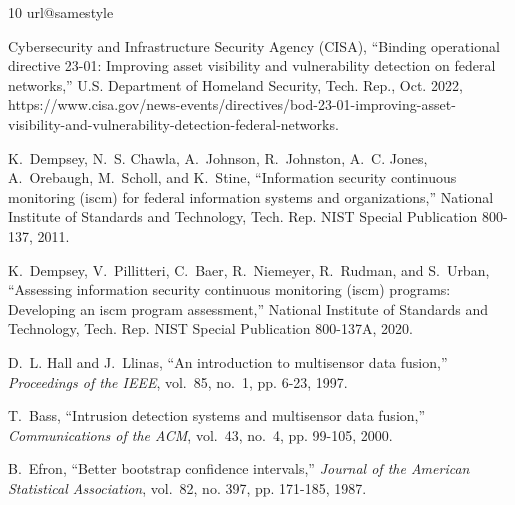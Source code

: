 \documentclass[journal]{IEEEtran}
\begin{document}
\begin{thebibliography}{10}
\providecommand{\url}[1]{#1}
\csname url@samestyle\endcsname
\providecommand{\newblock}{\relax}
\providecommand{\bibinfo}[2]{#2}
\providecommand{\BIBentrySTDinterwordspacing}{\spaceskip=0pt\relax}
\providecommand{\BIBentryALTinterwordstretchfactor}{4}
\providecommand{\BIBentryALTinterwordspacing}{\spaceskip=\fontdimen2\font plus
\BIBentryALTinterwordstretchfactor\fontdimen3\font minus
  \fontdimen4\font\relax}
\providecommand{\BIBforeignlanguage}[2]{{%
\expandafter\ifx\csname l@#1\endcsname\relax
\typeout{** WARNING: IEEEtran.bst: No hyphenation pattern has been}%
\typeout{** loaded for the language `#1'. Using the pattern for}%
\typeout{** the default language instead.}%
\else
\language=\csname l@#1\endcsname
\fi
#2}}
\providecommand{\BIBdecl}{\relax}
\BIBdecl

{Cybersecurity and Infrastructure Security Agency (CISA)}, ``Binding
  operational directive 23-01: Improving asset visibility and vulnerability
  detection on federal networks,'' U.S. Department of Homeland Security, Tech.
  Rep., Oct. 2022,
  \url{https://www.cisa.gov/news-events/directives/bod-23-01-improving-asset-visibility-and-vulnerability-detection-federal-networks}.

K.~Dempsey, N.~S. Chawla, A.~Johnson, R.~Johnston, A.~C. Jones, A.~Orebaugh,
  M.~Scholl, and K.~Stine, ``Information security continuous monitoring (iscm)
  for federal information systems and organizations,'' National Institute of
  Standards and Technology, Tech. Rep. NIST Special Publication 800-137, 2011.

K.~Dempsey, V.~Pillitteri, C.~Baer, R.~Niemeyer, R.~Rudman, and S.~Urban,
  ``Assessing information security continuous monitoring (iscm) programs:
  Developing an iscm program assessment,'' National Institute of Standards and
  Technology, Tech. Rep. NIST Special Publication 800-137A, 2020.

D.~L. Hall and J.~Llinas, ``An introduction to multisensor data fusion,''
  \emph{Proceedings of the IEEE}, vol.~85, no.~1, pp. 6-23, 1997.

T.~Bass, ``Intrusion detection systems and multisensor data fusion,''
  \emph{Communications of the ACM}, vol.~43, no.~4, pp. 99-105, 2000.

B.~Efron, ``Better bootstrap confidence intervals,'' \emph{Journal of the
  American Statistical Association}, vol.~82, no. 397, pp. 171-185, 1987.


\end{thebibliography}
\end{document}
